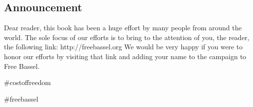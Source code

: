 \subsection{Announcement}\label{announcement}

Dear reader, this book has been a huge effort by many people from around
the world. The sole focus of our efforts is to bring to the attention of
you, the reader, the following link: http://freebassel.org We would be
very happy if you were to honor our efforts by visiting that link and
adding your name to the campaign to Free Bassel.

\large{\#costoffreedom}\label{costoffreedom}

\large{\#freebassel}\label{freebassel}
